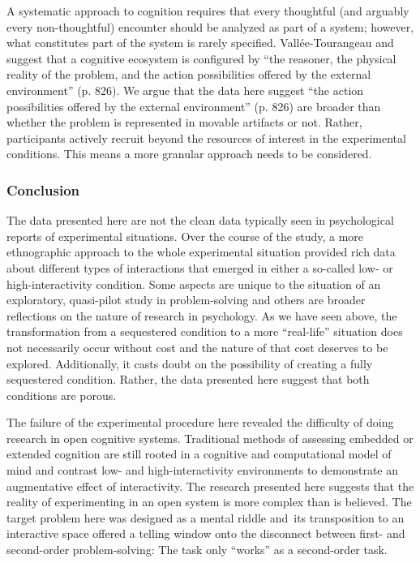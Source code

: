 \documentclass{article}
\begin{document}
A systematic approach to cognition requires that every thoughtful (and arguably every non-thoughtful) encounter should be analyzed as part of a system; however, what constitutes part of the system is rarely specified. Vallée-Tourangeau and \parencite{March2020} suggest that a cognitive ecosystem is configured by “the reasoner, the physical reality of the problem, and the action possibilities offered by the external environment” (p. 826). We argue that the data here suggest “the action possibilities offered by the external environment” (p. 826) are broader than whether the problem is represented in movable artifacts or not. Rather, participants actively recruit beyond the resources of interest in the experimental conditions. This means a more granular approach needs to be considered. 

\subsubsection{Conclusion}

The data presented here are not the clean data typically seen in psychological reports of experimental situations. Over the course of the study, a more ethnographic approach to the whole experimental situation provided rich data about different types of interactions that emerged in either a so-called low- or high-interactivity condition. Some aspects are unique to the situation of an exploratory, quasi-pilot study in problem-solving and others are broader reflections on the nature of research in psychology. As we have seen above, the transformation from a sequestered condition to a more “real-life” situation does not necessarily occur without cost and the nature of that cost deserves to be explored. Additionally, it casts doubt on the possibility of creating a fully sequestered condition. Rather, the data presented here suggest that both conditions are porous. 

The failure of the experimental procedure here revealed the difficulty of doing research in open cognitive systems. Traditional methods of assessing embedded or extended cognition are still rooted in a cognitive and computational model of mind and contrast low- and high-interactivity environments to demonstrate an augmentative effect of interactivity. The research presented here suggests that the reality of experimenting in an open system is more complex than is believed. The target problem here was designed as a mental riddle and its transposition to an interactive space offered a telling window onto the disconnect between first- and second-order problem-solving: The task only “works” as a second-order task.
\end{document}
